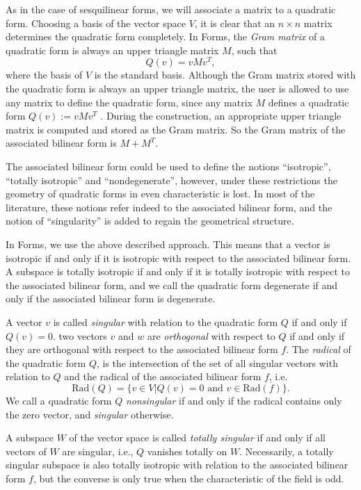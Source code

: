 \documentclass[a4paper,11pt]{report}
\begin{document}
{{ As in the case of sesquilinear forms, we will associate a matrix to a
quadratic form. Choosing a basis of the vector space $V$, it is clear that an $n \times n$ matrix determines the quadratic form completely. In \textsf{Forms}, the \emph{Gram matrix} of a quadratic form is always an upper triangle matrix $M$, such that 
\[Q(v) = vMv^T,\]
  where the basis of $V$ is the standard basis. Although the Gram matrix stored with the quadratic form
is always an upper triangle matrix, the user is allowed to use any matrix to
define the quadratic form, since any matrix $M$ defines a quadratic form  $Q(v) := vMv^T$ . During the construction, an appropriate upper triangle matrix is computed
and stored as the Gram matrix. So the Gram matrix of the associated bilinear
form is  $M+M^T$.  

 The associated bilinear form could be used to define the notions
``isotropic'', ``totally isotropic'' and
``non\texttt{}degenerate'', however, under these restrictions the
geometry of quadratic forms in even characteristic is lost. In most of the
literature, these notions refer indeed to the associated bilinear form, and
the notion of ``singularity'' is added to regain the geometrical structure. 

In \textsf{Forms}, we use the above described approach. This means that a vector is isotropic
if and only if it is isotropic with respect to the associated bilinear form. A
subspace is totally isotropic if and only if it is totally isotropic with
respect to the associated bilinear form, and we call the quadratic form
degenerate if and only if the associated bilinear form is degenerate. 

 A vector $v$ is called \emph{singular} with relation to the quadratic form $Q$ if and only if $Q(v)=0$. two vectors $v$ and $w$ are \emph{orthogonal} with respect to $Q$ if and only if they are orthogonal with respect to the associated bilinear
form $f$. The \emph{radical} of the quadratic form $Q$, is the intersection of the set of all singular vectors with relation to $Q$ and the radical of the associated bilinear form $f$, i.e.  
\[\mathrm{Rad}(Q) = \{v \in V | Q(v) = 0\,\, \mathrm{and}\,\, v \in \mathrm{Rad}(f)\}.\]
   We call a quadratic form $Q$ \emph{non\texttt{}singular} if and only if the radical contains only the zero vector, and \emph{singular} otherwise. 

 A subspace $W$ of the vector space is called \emph{totally singular} if and only if all vectors of $W$ are singular, i.e., $Q$ vanishes totally on $W$. Necessarily, a totally singular subspace is also totally isotropic with
relation to the associated bilinear form $f$, but the converse is only true when the characteristic of the field is odd. 

}}
\end{document}

